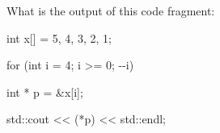 What is the output of this code fragment:



\begin{consolethree}[escapeinside=||]

int x[] = {5, 4, 3, 2, 1};



for (int i = 4; i >= 0; -\/-i)

{   

    int * p = &x[i];

    std::cout << (*p) << std::endl;

}

\end{consolethree}

